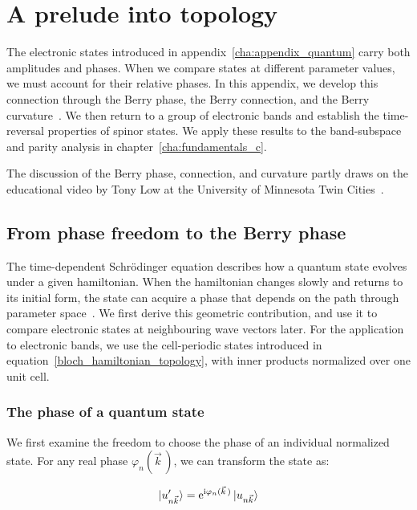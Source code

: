 \chapter{A prelude into topology}
\label{cha:appendix_topology}

The electronic states introduced in appendix~\ref{cha:appendix_quantum} carry both amplitudes and phases.
When we compare states at different parameter values, we must account for their relative phases.
In this appendix, we develop this connection through the Berry phase, the Berry connection, and the Berry curvature~\cite{cayssol2021topological}.
We then return to a group of electronic bands and establish the time-reversal properties of spinor states.
We apply these results to the band-subspace and parity analysis in chapter~\ref{cha:fundamentals_c}.

The discussion of the Berry phase, connection, and curvature partly draws on the educational video by Tony Low at the University of Minnesota Twin Cities~\cite{low2025berry}.

\newpage
\FloatBarrier
\section{From phase freedom to the Berry phase}
\label{sec:berry_phase_topology}

The time-dependent Schrödinger equation describes how a quantum state evolves under a given hamiltonian.
When the hamiltonian changes slowly and returns to its initial form, the state can acquire a phase that depends on the path through parameter space~\cite{resta2000manifestations}.
We first derive this geometric contribution, and use it to compare electronic states at neighbouring wave vectors later.
For the application to electronic bands, we use the cell-periodic states introduced in equation~\eqref{bloch_hamiltonian_topology},
with inner products normalized over one unit cell.

\FloatBarrier
\subsection{The phase of a quantum state}

We first examine the freedom to choose the phase of an individual normalized state.
For any real phase $\varphi_n(\vec{k}\,)$, we can transform the state as:

\begin{equation}
    \ket{u'_{n\vec{k}}}
    =\mathrm{e}^{\mathrm{i}\varphi_n(\vec{k}\,)}\ket{u_{n\vec{k}}}
\label{bloch_phase_freedom_topology}
\end{equation}

